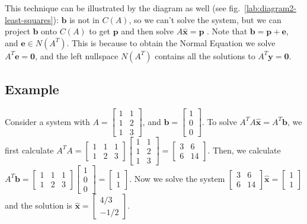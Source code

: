 \documentclass{acm_proc_article-sp}
\begin{document}
This technique can be illustrated by the diagram as well (see fig.~\ref{lab:diagram2-least-squares}): \(\mathbf b\) is not in \(C(A)\), so we can't solve the system, but we can project \(\mathbf b\) onto \(C(A)\) to get \(\mathbf p\) and then
solve \(A \hat {\mathbf x} = \mathbf p\) . Note that
\(\mathbf b = \mathbf p +\mathbf e\), and \(\mathbf e \in N(A^T)\). This is because
to obtain the Normal Equation we solve \(A^T \mathbf e = \mathbf 0\), and the left nullspace
\(N(A^T)\) contains all the solutions to \(A^T \mathbf y = \mathbf 0\).


\subsection{Example}

Consider a system with \(A = \begin{bmatrix} 1 & 1 \\ 1 & 2 \\ 1 & 3 \end{bmatrix}\),
and \(\mathbf b =\begin{bmatrix} 1 \\ 0 \\ 0 \end{bmatrix}\). To solve \(A^T A \hat {\mathbf x} = A^T \mathbf b\), we first calculate \(A^T A = \begin{bmatrix} 1 & 1 & 1 \\ 1 & 2 & 3 \end{bmatrix}
\begin{bmatrix} 1 & 1 \\ 1 & 2 \\ 1 & 3 \end{bmatrix} = \begin{bmatrix} 3 & 6 \\ 6 & 14
\end{bmatrix}\).
Then, we calculate \(A^T \mathbf b = \begin{bmatrix} 1 & 1 & 1 \\ 1 & 2 & 3 \end{bmatrix}
\begin{bmatrix} 1 \\ 0 \\ 0 \end{bmatrix} = \begin{bmatrix} 1 \\ 1 \end{bmatrix}\).
Now we solve the system \(\begin{bmatrix} 3 & 6 \\ 6 & 14 \end{bmatrix} \hat {\mathbf x} = \begin{bmatrix} 1 \\ 1 \end{bmatrix}\) and the solution is
\(\hat {\mathbf x} = \begin{bmatrix} 4/3 \\ -1/2 \end{bmatrix}\).
\end{document}
